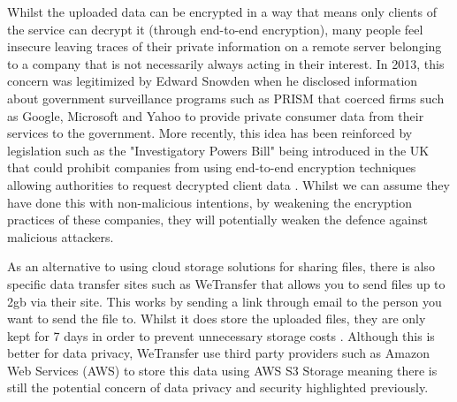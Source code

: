 \documentclass[]{report}
\begin{document}
 	Whilst the uploaded data can be encrypted in a way that means only clients of the service can decrypt it (through end-to-end encryption), many people feel insecure leaving traces of their private information on a remote server belonging to a company that is not necessarily always acting in their interest. In 2013, this concern was legitimized by Edward Snowden when he disclosed information about government surveillance programs such as PRISM that coerced firms such as Google, Microsoft and Yahoo to provide private consumer data from their services to the government.\cite{PRISM}  More recently, this idea has been reinforced by legislation such as the "Investigatory Powers Bill" being introduced in the UK that could prohibit companies from using end-to-end encryption techniques allowing authorities to request decrypted client data \cite{IPB Encryption}. Whilst we can assume they have done this with non-malicious intentions, by weakening the encryption practices of these companies, they will potentially weaken the defence against malicious attackers.
	
	As an alternative to using cloud storage solutions for sharing files, there is also specific data transfer sites such as WeTransfer that allows you to send files up to 2gb via their site. This works by sending a link through email to the person you want to send the file to. Whilst it does store the uploaded files, they are only kept for 7 days in order to prevent unnecessary storage costs \cite{WeTransfer Storage Time}. Although this is better for data privacy, WeTransfer use third party providers such as Amazon Web Services (AWS) to store this data using AWS S3 Storage \cite{WeTransfer AWS Case Study} meaning there is still the potential concern of data privacy and security highlighted previously.
	
\end{document}
